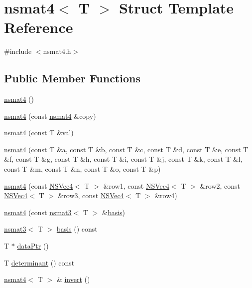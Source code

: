\hypertarget{structnsmat4}{\section{nsmat4$<$ T $>$ Struct Template Reference}
\label{structnsmat4}
}


{\ttfamily \#include $<$nsmat4.\-h$>$}

\subsection*{Public Member Functions}
\begin{DoxyCompactItemize}
\item 
\hyperlink{structnsmat4_a31784e9f45b137baff02cfdcacc0cc9e}{nsmat4} ()
\item 
\hyperlink{structnsmat4_a8bd1d3bf6b33a0b0919609730b6cf0ef}{nsmat4} (const \hyperlink{structnsmat4}{nsmat4} \&copy)
\item 
\hyperlink{structnsmat4_a903374993b2a55725973af4d4013c11c}{nsmat4} (const T \&val)
\item 
\hyperlink{structnsmat4_ae9c42ba0407b64b9de4aca88768a6988}{nsmat4} (const T \&a, const T \&b, const T \&c, const T \&d, const T \&e, const T \&f, const T \&g, const T \&h, const T \&i, const T \&j, const T \&k, const T \&l, const T \&m, const T \&n, const T \&o, const T \&p)
\item 
\hyperlink{structnsmat4_a4e2399259ca24d34758b7ea361a0e810}{nsmat4} (const \hyperlink{structNSVec4}{N\-S\-Vec4}$<$ T $>$ \&row1, const \hyperlink{structNSVec4}{N\-S\-Vec4}$<$ T $>$ \&row2, const \hyperlink{structNSVec4}{N\-S\-Vec4}$<$ T $>$ \&row3, const \hyperlink{structNSVec4}{N\-S\-Vec4}$<$ T $>$ \&row4)
\item 
\hyperlink{structnsmat4_a023dd44133399c21aa55296a21a3aefe}{nsmat4} (const \hyperlink{structnsmat3}{nsmat3}$<$ T $>$ \&\hyperlink{structnsmat4_ac112fb2077156ddeac42c213f67931a4}{basis})
\item 
\hyperlink{structnsmat3}{nsmat3}$<$ T $>$ \hyperlink{structnsmat4_ac112fb2077156ddeac42c213f67931a4}{basis} () const 
\item 
T $\ast$ \hyperlink{structnsmat4_afe3ae42391cf1bd702bd48f44f19d095}{data\-Ptr} ()
\item 
T \hyperlink{structnsmat4_ae4e04d53d4607ac67f2372a7991b641c}{determinant} () const 
\item 
\hyperlink{structnsmat4}{nsmat4}$<$ T $>$ \& \hyperlink{structnsmat4_aff828e0c9da7cb1509b3d46984ed137a}{invert} ()
\item 

\end{DoxyCompactItemize}
